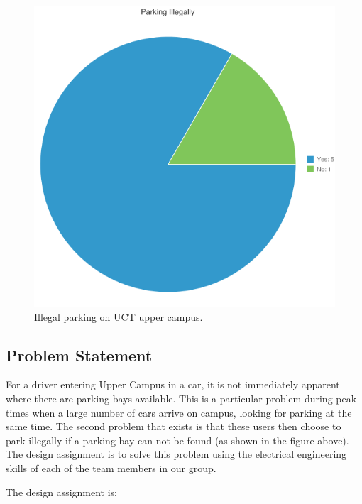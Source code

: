 \begin{figure}[H]
\begin{center}
\includegraphics[scale=0.55,clip]{data/chart.png}
\caption{Illegal parking on UCT upper campus.}
\end{center}
\end{figure}
 
\subsection{Problem Statement}
For  a  driver  entering  Upper  Campus  in  a  car,  it  is  not immediately  apparent  where  there  are  parking bays available.  This is a particular problem during peak times when a large number of cars arrive on campus, looking for parking at the same time. The second problem that exists is that these users then choose to park illegally if a parking bay can not be found (as shown in the figure above). The design assignment is to solve this problem using the electrical engineering skills of each of the team members in our group.\cite{assignment}

The design assignment is:

